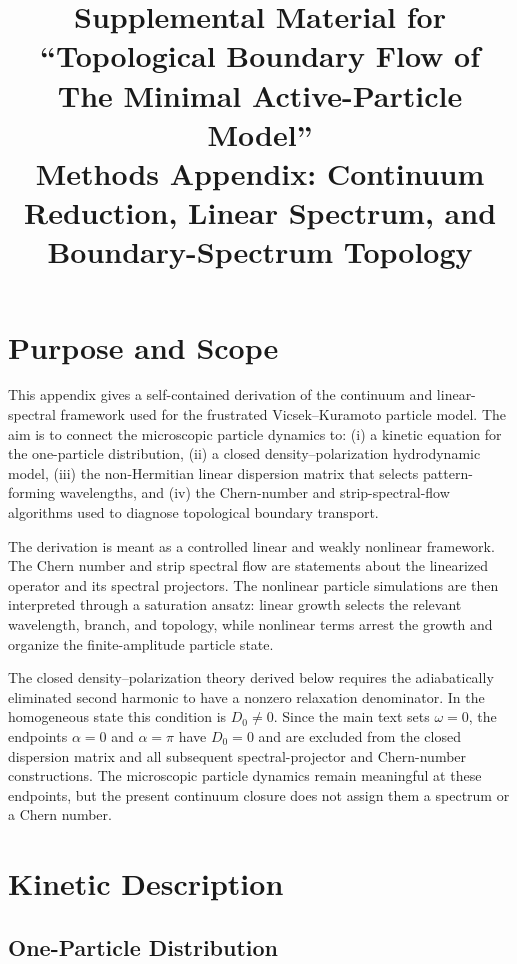 \documentclass[11pt]{article}
\title{Supplemental Material for ``Topological Boundary Flow of The Minimal Active-Particle Model''\\[0.4em]
\large Methods Appendix: Continuum Reduction, Linear Spectrum, and Boundary-Spectrum Topology}
\author{}
\date{}
\numberwithin{equation}{section}
\begin{document}
\maketitle

\section{Purpose and Scope}

This appendix gives a self-contained derivation of the continuum and
linear-spectral framework used for the frustrated Vicsek--Kuramoto
particle model. The aim is to connect the microscopic particle dynamics
to: (i) a kinetic equation for the one-particle distribution, (ii) a
closed density--polarization hydrodynamic model, (iii) the non-Hermitian
linear dispersion matrix that selects pattern-forming wavelengths, and
(iv) the Chern-number and strip-spectral-flow algorithms used to diagnose
topological boundary transport.

The derivation is meant as a controlled linear and weakly nonlinear
framework. The Chern number and strip spectral flow are statements about
the linearized operator and its spectral projectors. The nonlinear
particle simulations are then interpreted through a saturation ansatz:
linear growth selects the relevant wavelength, branch, and topology, while
nonlinear terms arrest the growth and organize the finite-amplitude
particle state.

The closed density--polarization theory derived below requires the
adiabatically eliminated second harmonic to have a nonzero relaxation
denominator. In the homogeneous state this condition is $D_0\ne0$. Since
the main text sets $\omega=0$, the endpoints $\alpha=0$ and $\alpha=\pi$
have $D_0=0$ and are excluded from the closed dispersion matrix and all
subsequent spectral-projector and Chern-number constructions. The
microscopic particle dynamics remain meaningful at these endpoints, but
the present continuum closure does not assign them a spectrum or a Chern
number.

\section{Kinetic Description}

\subsection{One-Particle Distribution}
\end{document}
